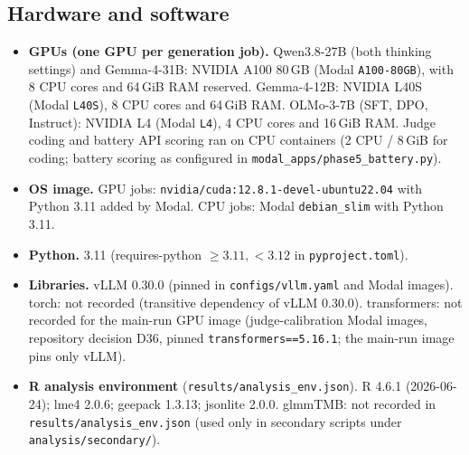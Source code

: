 \subsection{Hardware and software}
\begin{itemize}
\item \textbf{GPUs (one GPU per generation job).} Qwen3.8-27B (both thinking settings) and Gemma-4-31B: NVIDIA A100 80\,GB (Modal \texttt{A100-80GB}), with 8 CPU cores and 64\,GiB RAM reserved. Gemma-4-12B: NVIDIA L40S (Modal \texttt{L40S}), 8 CPU cores and 64\,GiB RAM. OLMo-3-7B (SFT, DPO, Instruct): NVIDIA L4 (Modal \texttt{L4}), 4 CPU cores and 16\,GiB RAM. Judge coding and battery API scoring ran on CPU containers (2 CPU / 8\,GiB for coding; battery scoring as configured in \texttt{modal\_apps/phase5\_battery.py}).
\item \textbf{OS image.} GPU jobs: \texttt{nvidia/cuda:12.8.1-devel-ubuntu22.04} with Python 3.11 added by Modal. CPU jobs: Modal \texttt{debian\_slim} with Python 3.11.
\item \textbf{Python.} 3.11 (requires-python $\geq 3.11,<3.12$ in \texttt{pyproject.toml}).
\item \textbf{Libraries.} vLLM 0.30.0 (pinned in \texttt{configs/vllm.yaml} and Modal images). torch: not recorded (transitive dependency of vLLM 0.30.0). transformers: not recorded for the main-run GPU image (judge-calibration Modal images, repository decision D36, pinned \texttt{transformers==5.16.1}; the main-run image pins only vLLM).
\item \textbf{R analysis environment} (\texttt{results/analysis\_env.json}). R 4.6.1 (2026-06-24); lme4 2.0.6; geepack 1.3.13; jsonlite 2.0.0. glmmTMB: not recorded in \texttt{results/analysis\_env.json} (used only in secondary scripts under \texttt{analysis/secondary/}).
\end{itemize}

